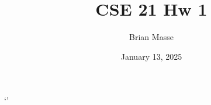 \documentclass[12pt, letterpaper]{article}
\title{CSE 21 Hw 1}
\author{Brian Masse}
\date{January 13, 2025}
\begin{document}
\maketitle
\newpage

`'
\end{document}

